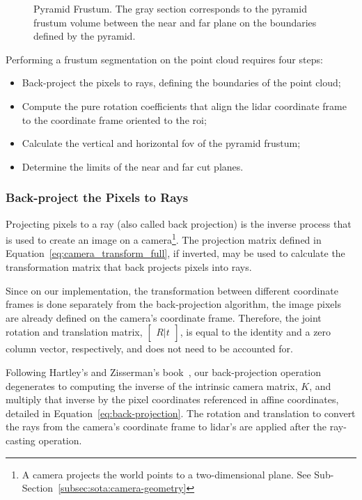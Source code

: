 \begin{figure}[H]
	\centering
	\def\svgwidth{0.3\columnwidth}
	\graphicspath{{img/image-object-to-point-cloud/}}
	
	\caption[Representation of a pyramid frustum.]{Pyramid Frustum. The gray section corresponds to the pyramid frustum volume between the near and far plane on the boundaries defined by the pyramid.}
	\label{fig:pyramid-frustum}
\end{figure}

Performing a frustum segmentation on the point cloud requires four steps:

\begin{itemize}
	\item Back-project the pixels to rays, defining the boundaries of the point cloud;
	\item Compute the pure rotation coefficients that align the \ac{lidar} coordinate frame to the coordinate frame oriented to the \ac{roi};
	\item Calculate the vertical and horizontal \acf{fov} of the pyramid frustum;
	\item Determine the limits of the near and far cut planes.
\end{itemize}

\subsubsection{Back-project the Pixels to Rays}
Projecting pixels to a ray (also called back projection) is the inverse process that is used to create an image on a camera\footnote{A camera projects the world points to a two-dimensional plane. See Sub-Section~\ref{subsec:sota:camera-geometry}}. The projection matrix defined in Equation~\eqref{eq:camera_transform_full}, if inverted, may be used to calculate the transformation matrix that  back projects pixels into rays.

Since on our implementation, the transformation between different coordinate frames is done separately from the back-projection algorithm, the image pixels are already defined on the camera's coordinate frame. Therefore, the joint rotation and translation matrix, $\begin{bmatrix} R|t \end{bmatrix}$, is equal to the identity and a zero column vector, respectively, and does not need to be accounted for.

Following Hartley's and Zisserman's book~\cite{mvg_book}, our back-projection operation degenerates to computing the inverse of the intrinsic camera matrix, $K$, and multiply that inverse by the pixel coordinates referenced in affine coordinates, detailed in Equation~\eqref{eq:back-projection}. The rotation and translation to convert the rays from the camera's coordinate frame to \ac{lidar}'s are applied after the ray-casting operation.

